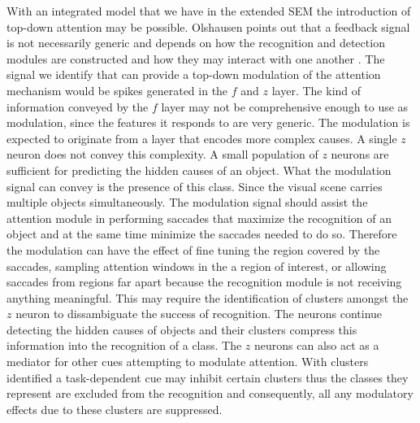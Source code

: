 \documentclass{report}
\begin{document}
With an integrated model that we have in the extended SEM the introduction of top-down attention may be possible. Olshausen points out that a feedback signal is not necessarily generic and depends on how the recognition and detection modules are constructed and how they may interact with one another \cite{Olshausen1993}. The signal we identify that can provide a top-down modulation of the attention mechanism would be spikes generated in the $f$ and $z$ layer. The kind of information conveyed by the $f$ layer may not be comprehensive enough to use as modulation, since the features it responds to are very generic. The modulation is expected to originate from a layer that encodes more complex causes. A single $z$ neuron does not convey this complexity. A small population of $z$ neurons are sufficient for predicting the hidden causes of an object. What the modulation signal can convey is the presence of this class. Since the visual scene carries multiple objects simultaneously. The modulation signal should assist the attention module in performing saccades that maximize the recognition of an object and at the same time minimize the saccades needed to do so. Therefore the modulation can have the effect of fine tuning the region covered by the saccades, sampling attention windows in the a region of interest, or allowing saccades from regions far apart because the recognition module is not receiving anything meaningful. This may require the identification of clusters amongst the $z$ neuron to dissambiguate the success of recognition. The neurons continue detecting the hidden causes of objects and their clusters compress this information into the recognition of a class. The $z$ neurons can also act as a mediator for other cues attempting to modulate attention. With clusters identified a task-dependent cue may inhibit certain clusters thus the classes they represent are excluded from the recognition and consequently, all any modulatory effects due to these clusters are suppressed.
\end{document}
